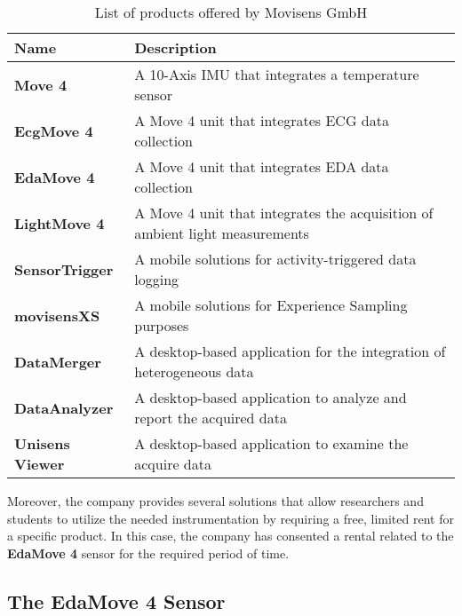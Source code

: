 \begin{table}[H]
\centering
\begin{tabular}{ll}
    \hline
    Name                     &  Description \\
    \hline
    \textbf{Move 4}          & A 10-Axis IMU that integrates a temperature sensor \\
    \textbf{EcgMove 4}       & A Move 4 unit that integrates ECG data collection  \\
    \textbf{EdaMove 4}       & A Move 4 unit that integrates EDA data collection \\
    \textbf{LightMove 4}     & A Move 4 unit that integrates the acquisition of ambient light measurements \\
    \textbf{SensorTrigger}   & A mobile solutions for activity-triggered data logging \\
    \textbf{movisensXS}      & A mobile solutions for Experience Sampling purposes \\
    \textbf{DataMerger}      & A desktop-based application for the integration of heterogeneous data \\
    \textbf{DataAnalyzer}    & A desktop-based application to analyze and report the acquired data \\
    \textbf{Unisens Viewer}  & A desktop-based application to examine the acquire data \\
    \hline
\end{tabular}
\caption{List of products offered by Movisens GmbH}
\label{toc:movisens-products}
\end{table}

Moreover, the company provides several solutions that allow researchers and students to utilize the needed instrumentation by requiring a free, limited rent for a specific product. In this case, the company has consented a rental related to the \textbf{EdaMove 4} sensor for the required period of time. 

\subsection{The EdaMove 4 Sensor}\label{subsec:edamove4}



